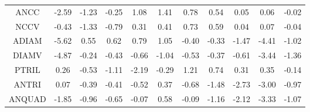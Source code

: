 \documentclass[11pt,a4paper]{report}
\begin{document}
\begin{longtable}{ | c || c | c | c | c | c | c | c | c | c || c |}
ANCC &  \cellcolor[HTML]{FFBFBF} -2.59 &  \cellcolor[HTML]{FFDFDF} -1.23 &  \cellcolor[HTML]{FFF7F7} -0.25 &  \cellcolor[HTML]{E7E7FF} 1.08 &  \cellcolor[HTML]{DFDFFF} 1.41 &  \cellcolor[HTML]{EFEFFF} 0.78 &  \cellcolor[HTML]{EFEFFF} 0.54 &  \cellcolor[HTML]{FFFFFF} 0.05 &  \cellcolor[HTML]{FFFFFF} 0.06 &  \cellcolor[HTML]{FFFFFF} -0.02 \\
NCCV &  \cellcolor[HTML]{FFF7F7} -0.43 &  \cellcolor[HTML]{FFDFDF} -1.33 &  \cellcolor[HTML]{FFEFEF} -0.79 &  \cellcolor[HTML]{F7F7FF} 0.31 &  \cellcolor[HTML]{F7F7FF} 0.41 &  \cellcolor[HTML]{EFEFFF} 0.73 &  \cellcolor[HTML]{EFEFFF} 0.59 &  \cellcolor[HTML]{FFFFFF} 0.04 &  \cellcolor[HTML]{FFFFFF} 0.07 &  \cellcolor[HTML]{FFFFFF} -0.04 \\
ADIAM &  \cellcolor[HTML]{FF7070} -5.62 &  \cellcolor[HTML]{EFEFFF} 0.55 &  \cellcolor[HTML]{EFEFFF} 0.62 &  \cellcolor[HTML]{EFEFFF} 0.79 &  \cellcolor[HTML]{E7E7FF} 1.05 &  \cellcolor[HTML]{FFF7F7} -0.40 &  \cellcolor[HTML]{FFF7F7} -0.33 &  \cellcolor[HTML]{FFD7D7} -1.47 &  \cellcolor[HTML]{FF8F8F} -4.41 &  \cellcolor[HTML]{FFE7E7} -1.02 \\
DIAMV &  \cellcolor[HTML]{FF8787} -4.87 &  \cellcolor[HTML]{FFF7F7} -0.24 &  \cellcolor[HTML]{FFF7F7} -0.43 &  \cellcolor[HTML]{FFEFEF} -0.66 &  \cellcolor[HTML]{FFE7E7} -1.04 &  \cellcolor[HTML]{FFEFEF} -0.53 &  \cellcolor[HTML]{FFF7F7} -0.37 &  \cellcolor[HTML]{FFEFEF} -0.61 &  \cellcolor[HTML]{FFA7A7} -3.44 &  \cellcolor[HTML]{FFDFDF} -1.36 \\
PTRIL &  \cellcolor[HTML]{F7F7FF} 0.26 &  \cellcolor[HTML]{FFEFEF} -0.53 &  \cellcolor[HTML]{FFE7E7} -1.11 &  \cellcolor[HTML]{FFC7C7} -2.19 &  \cellcolor[HTML]{FFF7F7} -0.29 &  \cellcolor[HTML]{DFDFFF} 1.21 &  \cellcolor[HTML]{EFEFFF} 0.74 &  \cellcolor[HTML]{F7F7FF} 0.31 &  \cellcolor[HTML]{F7F7FF} 0.35 &  \cellcolor[HTML]{FFFFFF} -0.14 \\
ANTRI &  \cellcolor[HTML]{FFFFFF} 0.07 &  \cellcolor[HTML]{FFF7F7} -0.39 &  \cellcolor[HTML]{FFF7F7} -0.41 &  \cellcolor[HTML]{FFEFEF} -0.52 &  \cellcolor[HTML]{F7F7FF} 0.37 &  \cellcolor[HTML]{FFEFEF} -0.68 &  \cellcolor[HTML]{FFD7D7} -1.48 &  \cellcolor[HTML]{FFB7B7} -2.73 &  \cellcolor[HTML]{FFB7B7} -3.00 &  \cellcolor[HTML]{FFE7E7} -0.97 \\
ANQUAD &  \cellcolor[HTML]{FFCFCF} -1.85 &  \cellcolor[HTML]{FFE7E7} -0.96 &  \cellcolor[HTML]{FFEFEF} -0.65 &  \cellcolor[HTML]{FFFFFF} -0.07 &  \cellcolor[HTML]{EFEFFF} 0.58 &  \cellcolor[HTML]{FFFFFF} -0.09 &  \cellcolor[HTML]{FFDFDF} -1.16 &  \cellcolor[HTML]{FFC7C7} -2.12 &  \cellcolor[HTML]{FFA7A7} -3.33 &  \cellcolor[HTML]{FFE7E7} -1.07 \\

\end{longtable}
\end{document}
